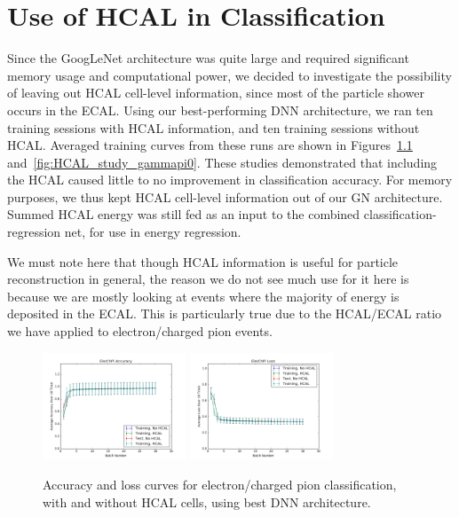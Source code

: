 \chapter{Use of HCAL in Classification}\label{app:classification_HCAL}

Since the GoogLeNet architecture was quite large and required significant memory usage and computational power, we decided to investigate the possibility of leaving out HCAL cell-level information, since most of the particle shower occurs in the ECAL. Using our best-performing DNN architecture, we ran ten training sessions with HCAL information, and ten training sessions without HCAL. Averaged training curves from these runs are shown in Figures~\ref{fig:HCAL_study_elechpi} and~\ref{fig:HCAL_study_gammapi0}. These studies demonstrated that including the HCAL caused little to no improvement in classification accuracy. For memory purposes, we thus kept HCAL cell-level information out of our GN architecture. Summed HCAL energy was still fed as an input to the combined classification-regression net, for use in energy regression.

We must note here that though HCAL information is useful for particle reconstruction in general, the reason we do not see much use for it here is because we are mostly looking at events where the majority of energy is deposited in the ECAL. This is particularly true due to the HCAL/ECAL ratio we have applied to electron/charged pion events.

\begin{figure}[htbp]
\centering
\includegraphics[width=0.38\textwidth]{Images/Calo/HCAL_study_elechpi_accuracy.png}
\includegraphics[width=0.38\textwidth]{Images/Calo/HCAL_study_elechpi_loss.png}
\caption{Accuracy and loss curves for electron/charged pion classification, with and without HCAL cells, using best DNN architecture.}
\label{fig:HCAL_study_elechpi}
\end{figure}

